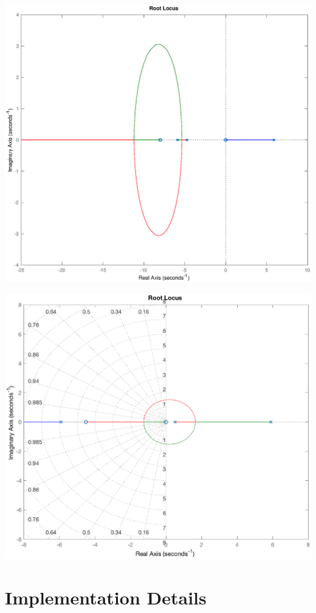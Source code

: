 \documentclass[12pt,letterpaper]{article}
\begin{document}
\includegraphics[width=\textwidth]{images/rootLocusPD.eps} 
    \label{rootLocusPD}

\includegraphics[width=\textwidth]{images/rootLocusFull.eps} 
    \label{rootLocusFull}

\section{Implementation Details}
\end{document}
